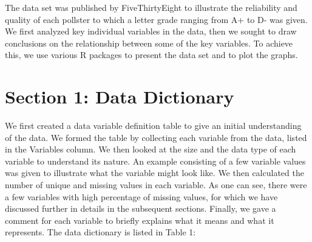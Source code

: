 \documentclass[
  11pt,
]{article}
\begin{document}
The data set was published by FiveThirtyEight to illustrate the
reliability and quality of each pollster to which a letter grade ranging
from A+ to D- was given. We first analyzed key individual variables in
the data, then we sought to draw conclusions on the relationship between
some of the key variables. To achieve this, we use various R packages to
present the data set and to plot the graphs.

\hypertarget{section-1-data-dictionary}{%
\section{Section 1: Data Dictionary}\label{section-1-data-dictionary}}

We first created a data variable definition table to give an initial
understanding of the data. We formed the table by collecting each
variable from the data, listed in the Variables column. We then looked
at the size and the data type of each variable to understand its nature.
An example consisting of a few variable values was given to illustrate
what the variable might look like. We then calculated the number of
unique and missing values in each variable. As one can see, there were a
few variables with high percentage of missing values, for which we have
discussed further in details in the subsequent sections. Finally, we
gave a comment for each variable to briefly explains what it means and
what it represents. The data dictionary is listed in Table 1:
\end{document}
